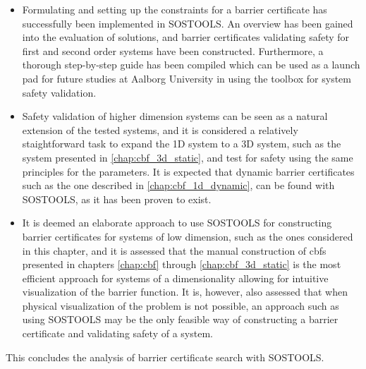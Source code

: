 \begin{itemize}
\item Formulating and setting up the constraints for a barrier certificate has successfully been implemented in SOSTOOLS. An overview has been gained into the evaluation of solutions, and barrier certificates validating safety for first and second order systems have been constructed. Furthermore, a thorough step-by-step guide has been compiled which can be used as a launch pad for future studies at Aalborg University in using the toolbox for system safety validation. 

\item Safety validation of  higher dimension systems can be seen as a natural extension of the tested systems, and it is considered a relatively staightforward task to expand the 1D system to a 3D system, such as the system presented in \autoref{chap:cbf_3d_static}, and test for safety using the same principles for the parameters. It is expected that dynamic barrier certificates such as the one described in \autoref{chap:cbf_1d_dynamic}, can be found with SOSTOOLS, as it has been proven to exist.

\item It is deemed an elaborate approach to use SOSTOOLS for constructing barrier certificates for systems of low dimension, such as the ones considered in this chapter, and it is assessed that the manual construction of \glspl{cbf} presented in chapters \ref{chap:cbf} through \ref{chap:cbf_3d_static} is the most efficient approach for systems of a dimensionality allowing for intuitive visualization of the barrier function.
It is, however, also assessed that when physical visualization of the problem is not possible, an approach such as using SOSTOOLS may be the only feasible way of constructing a barrier certificate and validating safety of a system.
\end{itemize}

This concludes the analysis of barrier certificate search with SOSTOOLS.



